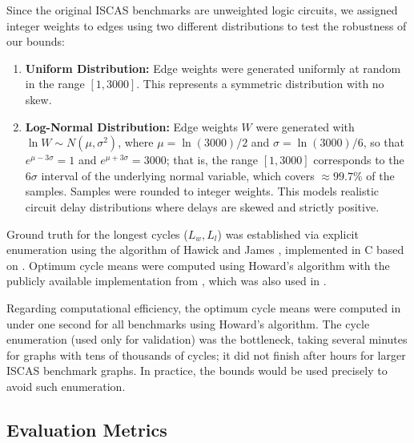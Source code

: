 \documentclass{article}
\theoremstyle{definition}
\begin{document}
Since the original ISCAS benchmarks are unweighted logic circuits, we
assigned integer weights to edges using two different distributions to
test the robustness of our bounds:
\begin{enumerate}
    \item \textbf{Uniform Distribution:} Edge weights were generated
      uniformly at random in the range $[1, 3000]$. This represents a
      symmetric distribution with no skew.
    \item \textbf{Log-Normal Distribution:} Edge weights $W$ were
      generated with $\ln W \sim N(\mu, \sigma^2)$, where $\mu =
      \ln(3000)/2$ and $\sigma = \ln(3000)/6$, so that $e^{\mu -
        3\sigma} = 1$ and $e^{\mu + 3\sigma} = 3000$; that is, the
      range $[1, 3000]$ corresponds to the $6\sigma$ interval of the
      underlying normal variable, which covers $\approx 99.7\%$ of the
      samples. Samples were rounded to integer weights. This models
      realistic circuit delay distributions where delays are skewed
      and strictly positive.
\end{enumerate}

Ground truth for the longest cycles ($L_w, L_l$) was established via
explicit enumeration using the algorithm of Hawick and James
\citep{HaJa08}, implemented in C based on \citep{Sc08}. Optimum cycle
means were computed using Howard's algorithm with the publicly
available implementation from \citep{Da15}, which was also used in
\citep{Da04}.

Regarding computational efficiency, the optimum cycle means were
computed in under one second for all benchmarks using Howard's
algorithm. The cycle enumeration (used only for validation) was the
bottleneck, taking several minutes for graphs with tens of thousands
of cycles; it did not finish after hours for larger ISCAS benchmark
graphs. In practice, the bounds would be used precisely to avoid such
enumeration.

\subsection{Evaluation Metrics}
\end{document}

